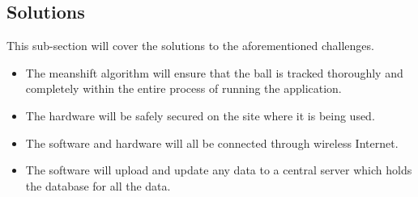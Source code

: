 \newpage

\subsection{Solutions}
This sub-section will cover the solutions to the aforementioned challenges.
\begin{itemize}
    \item The meanshift algorithm will ensure that the ball is tracked thoroughly and completely within the entire process of running the application.
    \item The hardware will be safely secured on the site where it is being used.
    \item The software and hardware will all be connected through wireless Internet.
    \item The software will upload and update any data to a central server which holds the database for all the data.
\end{itemize}



